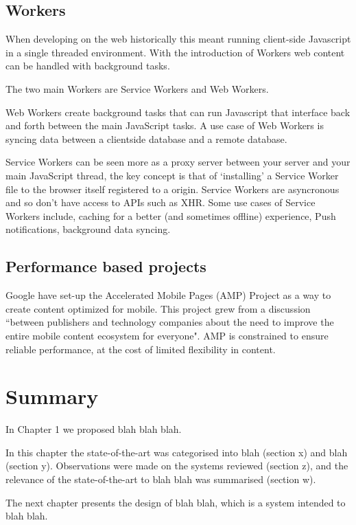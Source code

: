 
\subsection{Workers}

When developing on the web historically this meant running client-side Javascript in a single threaded environment. With the introduction of Workers web content can be handled with background tasks.

The two main Workers are Service Workers and Web Workers.

Web Workers create background tasks that can run Javascript that interface back and forth between the main JavaScript tasks. A use case of Web Workers is syncing data between a clientside database and a remote database. \cite{using_web_workers}

Service Workers can be seen more as a proxy server between your server and your main JavaScript thread, the key concept is that of `installing' a Service Worker file to the browser itself registered to a origin. Service Workers are asyncronous and so don't have access to APIs such as XHR.
Some use cases of Service Workers include, caching for a better (and sometimes offline) experience, Push notifications, background data syncing. \cite{service_worker}

\subsection{Performance based projects}

Google have set-up the Accelerated Mobile Pages (AMP) Project as a way to create content optimized for mobile. This project grew from a discussion ``between publishers and technology companies about the need to improve the entire mobile content ecosystem for everyone". AMP is constrained to ensure reliable performance, at the cost of limited flexibility in content. \cite{intro_to_amp}

\section{Summary} \label{l-r--summary}

In Chapter 1 we proposed blah blah blah.

In this chapter the state-of-the-art was categorised into blah (section x) and  blah (section y).  Observations were made on the systems reviewed (section z), and the relevance of the state-of-the-art to blah blah was summarised (section w).

The next chapter presents the design of blah blah, which is a system intended to blah blah.

